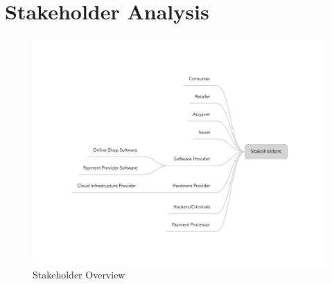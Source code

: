 
\section{Stakeholder Analysis}
\label{sec:stakeholder_analysis}

\begin{figure}[H]
	\centering
		\includegraphics[width=0.8\columnwidth]{images/Stakeholders.pdf}
	\caption{Stakeholder Overview}
\label{fig:images_stakeholder_overview}
\end{figure}

